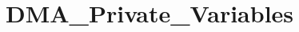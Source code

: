 \hypertarget{group___d_m_a___private___variables}{}\section{D\+M\+A\+\_\+\+Private\+\_\+\+Variables}
\label{group___d_m_a___private___variables}

